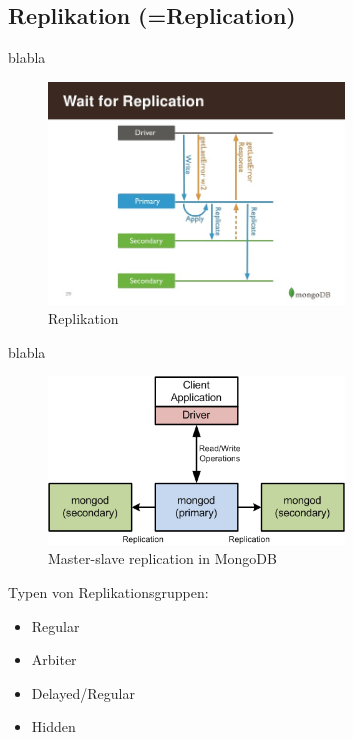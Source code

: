 \subsection{Replikation (=Replication)}
blabla

\begin{figure}
\centering
\includegraphics[width=0.7\textwidth]{resources/replication}
\caption[Replikation]{Replikation\protect\footnotemark}
\label{img:Replikation}
\end{figure}

blabla
\begin{figure}
\centering
\includegraphics[width=0.7\textwidth]{resources/mongo_replication}
\caption[Master-slave replication in MongoDB]{Master-slave replication in MongoDB\protect\footnotemark}
\label{img:mongo_replication}
\end{figure}



Typen von Replikationsgruppen:
\begin{itemize}
\item Regular
\item Arbiter
\item Delayed/Regular
\item Hidden
\end{itemize}
